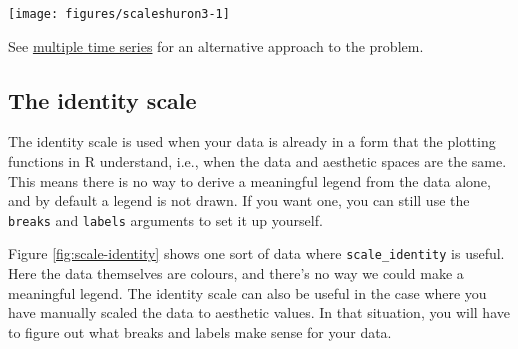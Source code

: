 \begin{Shaded}
\begin{Highlighting}[]
\NormalTok{>}\StringTok{ }
\NormalTok{+}\StringTok{   }\NormalTok{(}\NormalTok{(} \StringTok{ }\NormalTok{, } \NormalTok{)) +}\StringTok{ }
\NormalTok{+}\StringTok{   }\NormalTok{(}\NormalTok{(} \StringTok{ }\NormalTok{, } \NormalTok{)) +}\StringTok{ }
\NormalTok{+}\StringTok{   }\NormalTok{(}\NormalTok{, }
\NormalTok{+}\StringTok{                       }\NormalTok{(} \NormalTok{=}\NormalTok{, } \NormalTok{=}\NormalTok{))}
\end{Highlighting}
\end{Shaded}

\begin{flushleft}\texttt{[image: figures/scaleshuron3-1]} \end{flushleft}

See \hyperref[sub:time-series]{multiple time series} for an alternative
approach to the problem.

\subsection{The identity scale}\label{sub:scale-identity}

The identity scale is used when your data is already in a form that the
plotting functions in R understand, i.e., when the data and aesthetic
spaces are the same. This means there is no way to derive a meaningful
legend from the data alone, and by default a legend is not drawn. If you
want one, you can still use the \texttt{breaks} and \texttt{labels}
arguments to set it up yourself. 

Figure \ref{fig:scale-identity} shows one sort of data where
\texttt{scale\_identity} is useful. Here the data themselves are
colours, and there's no way we could make a meaningful legend. The
identity scale can also be useful in the case where you have manually
scaled the data to aesthetic values. In that situation, you will have to
figure out what breaks and labels make sense for your data.

